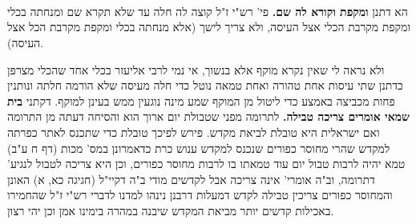 \documentclass[12pt, openany]{book}
\newcommand{\sethebfont}{
\fontsize{10.5pt}{21.0pt} \selectfont
}
\newcommand{\twocol}[1]{
	{\sethebfont \begin{multicols}{2}
			#1
	\end{multicols}}	
}
\newcommand{\textblock}[1]{
{\sethebfont #1\\}	
}
\begin{document}
\textblock{}{}
\textblock{}{}
\textblock{}{}
\twocol{הא דתנן \textbf{ומקפת וקורא לה שם.}  פי' רש"י ז"ל קוצה לה חלה עד שלא תקרא שם ומנחתה בכלי ומקפת מקרבת הכלי אצל העיסה, ולא צריך לישך (אלא מנחתה בכלי ומקפת מקרבת הכל אצל העיסה).\par  ולא נראה לי שאין נקרא מוקף אלא בנשוך, אי נמי לרבי אליעזר בכלי אחד שהכלי מצרפן כדתנן שתי עיסות אחת טהורה ואחת טמאה נוטל כדי חלה מעיסה שלא הורמה חלתה ונותנין פחות מכביצה באמצע כדי ליטול מן המוקף שמע מינה נוגעין ממש בעינן למוקף. 
\parוהא דקתני \textbf{בית שמאי אומרים צריכה טבילה.}  לתרומה מפני שטבולת יום ארוך הוא והסיחה דעתה מן התרומה ואם ישראלית היא טובלת לביאת מקדש. פירש לפיכך טובלת כדי שתכנס לאתר כפרתה למקדש שהרי מחוסר כפורים שנכנס למקדש ענוש כרת כדאמרונן במס' מכות (דף ח ע"ב) טמא יהיה לרבות טבול יום עוד טמאתו בו לרבות מחוסר כפורים, וכן היא צריכה לטבול לנגיע' דתרומה, וב"ה אומרי' אינה צריכה אבל לקדשים מודי ב"ה דקיי"ל (חגיגה כא, א) האונן והמחוסר כפורים צריכין טבילה לקדש דמעלות דרבנן נינהו למדנו לדברי רש"י ז"ל שהחמירו באכילות קדשים יותר מביאת המקדש שיבנה במהרה בימינו אמן וכן יהי רצון. 
\par}
\end{document}
